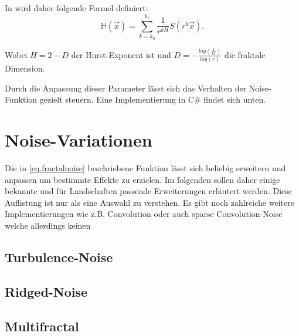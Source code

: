 In \cite{Saupe} wird daher folgende Formel definiert:
\begin{equation} \label{eq.fractalnoise}
	\mathbb{H}(\vec{x}) = \sum_{k=k_0}^{k_1}\frac{1}{r^{kH}}S(r^k\vec{x}).
\end{equation}

Wobei $H=2-D$ der Hurst-Exponent ist\cite{tuMuenchen} und $D=-\frac{log(\frac{1}{k1})}{log(r)}$\cite{fraktDim} die fraktale Dimension.

Durch die Anpassung dieser Parameter lässt sich das Verhalten der Noise-Funktion gezielt steuern. Eine Implementierung in C\# findet sich unten.



\section{Noise-Variationen}\label{NoiseVariationen}
Die in \ref{eq.fractalnoise} beschriebene Funktion lässt sich beliebig erweitern und anpassen um bestimmte Effekte zu erzielen. Im folgenden sollen daher einige bekannte und für Landschaften passende Erweiterungen erläutert werden. Diese Auflistung ist nur als eine Auswahl zu verstehen. Es gibt noch zahlreiche weitere Implementierungen wie z.B. Convolution oder auch sparse Convolution-Noise\cite{texturingAndModeling} %
welche allerdings keinen 

\subsection{Turbulence-Noise}

\subsection{Ridged-Noise}

\subsection{Multifractal}









